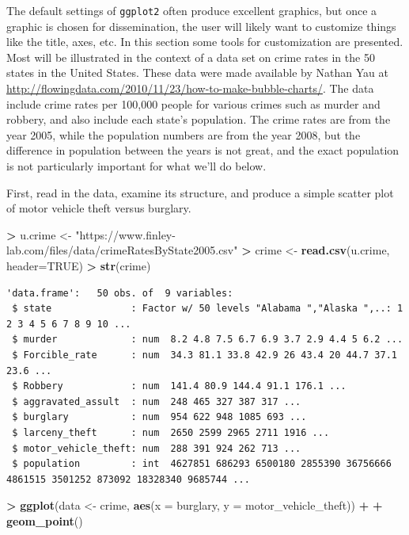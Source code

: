 \documentclass[
]{krantz}
\makeatletter
\newenvironment{Shaded}{\begin{snugshade}}{\end{snugshade}}
\newcommand{\DataTypeTok}[1]{\textcolor[rgb]{0.27,0.27,0.27}{#1}}
\newcommand{\KeywordTok}[1]{\textcolor[rgb]{0.27,0.27,0.27}{\textbf{#1}}}
\newcommand{\NormalTok}[1]{#1}
\newcommand{\OperatorTok}[1]{\textcolor[rgb]{0.43,0.43,0.43}{\textbf{#1}}}
\newcommand{\OtherTok}[1]{\textcolor[rgb]{0.37,0.37,0.37}{#1}}
\newcommand{\StringTok}[1]{\textcolor[rgb]{0.5,0.5,0.5}{#1}}
\newenvironment{kframe}{%
\medskip{}
\setlength{\fboxsep}{.8em}
 \def\at@end@of@kframe{}%
 \ifinner\ifhmode%
  \def\at@end@of@kframe{\end{minipage}}%
  \begin{minipage}{\columnwidth}%
 \fi\fi%
 \def\FrameCommand##1{\hskip\@totalleftmargin \hskip-\fboxsep
 \colorbox{shadecolor}{##1}\hskip-\fboxsep
     \hskip-\linewidth \hskip-\@totalleftmargin \hskip\columnwidth}%
 \MakeFramed {\advance\hsize-\width
   \@totalleftmargin\z@ \linewidth\hsize
   \@setminipage}}%
 {\par\unskip\endMakeFramed%
 \at@end@of@kframe}
\renewenvironment{Shaded}{\begin{kframe}}{\end{kframe}}
\makeatother
\begin{document}
The default settings of \texttt{ggplot2} often produce excellent graphics, but once a graphic is chosen for dissemination, the user will likely want to customize things like the title, axes, etc. In this section some tools for customization are presented. Most will be illustrated in the context of a data set on crime rates in the 50 states in the United States. These data were made available by Nathan Yau at \url{http://flowingdata.com/2010/11/23/how-to-make-bubble-charts/}. The data include crime rates per 100,000 people for various crimes such as murder and robbery, and also include each state's population. The crime rates are from the year 2005, while the population numbers are from the year 2008, but the difference in population between the years is not great, and the exact population is not particularly important for what we'll do below.

First, read in the data, examine its structure, and produce a simple scatter plot of motor vehicle theft versus burglary.

\begin{Shaded}
\begin{Highlighting}[]
\OperatorTok{\textgreater{}}\StringTok{ }\NormalTok{u.crime \textless{}{-}}\StringTok{ "https://www.finley{-}lab.com/files/data/crimeRatesByState2005.csv"}
\OperatorTok{\textgreater{}}\StringTok{ }\NormalTok{crime \textless{}{-}}\StringTok{ }\KeywordTok{read.csv}\NormalTok{(u.crime, }\DataTypeTok{header=}\OtherTok{TRUE}\NormalTok{)}
\OperatorTok{\textgreater{}}\StringTok{ }\KeywordTok{str}\NormalTok{(crime)}
\end{Highlighting}
\end{Shaded}

\begin{verbatim}
'data.frame':   50 obs. of  9 variables:
 $ state              : Factor w/ 50 levels "Alabama ","Alaska ",..: 1 2 3 4 5 6 7 8 9 10 ...
 $ murder             : num  8.2 4.8 7.5 6.7 6.9 3.7 2.9 4.4 5 6.2 ...
 $ Forcible_rate      : num  34.3 81.1 33.8 42.9 26 43.4 20 44.7 37.1 23.6 ...
 $ Robbery            : num  141.4 80.9 144.4 91.1 176.1 ...
 $ aggravated_assult  : num  248 465 327 387 317 ...
 $ burglary           : num  954 622 948 1085 693 ...
 $ larceny_theft      : num  2650 2599 2965 2711 1916 ...
 $ motor_vehicle_theft: num  288 391 924 262 713 ...
 $ population         : int  4627851 686293 6500180 2855390 36756666 4861515 3501252 873092 18328340 9685744 ...
\end{verbatim}

\begin{Shaded}
\begin{Highlighting}[]
\OperatorTok{\textgreater{}}\StringTok{ }\KeywordTok{ggplot}\NormalTok{(data \textless{}{-}}\StringTok{ }\NormalTok{crime, }\KeywordTok{aes}\NormalTok{(}\DataTypeTok{x =}\NormalTok{ burglary, }\DataTypeTok{y =}\NormalTok{ motor\_vehicle\_theft)) }\OperatorTok{+}\StringTok{ }
\OperatorTok{+}\StringTok{     }\KeywordTok{geom\_point}\NormalTok{()}
\end{Highlighting}
\end{Shaded}
\end{document}

